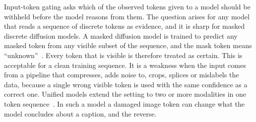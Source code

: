 
Input-token gating asks which of the observed tokens given to a model should be withheld before the model reasons from
them.
The question arises for any model that reads a sequence of discrete tokens as evidence, and it is sharp for masked
discrete diffusion models.
A masked diffusion model is trained to predict any masked token from any visible subset of the sequence, and the mask
token means ``unknown''~\citep{austin2021d3pm,sahoo2024mdlm,ou2025radd}.
Every token that is visible is therefore treated as certain.
This is acceptable for a clean training sequence.
It is a weakness when the input comes from a pipeline that compresses, adds noise to, crops, splices or mislabels the data,
because a single wrong visible token is used with the same confidence as a correct one.
Unified models extend the setting to two or more modalities in one token sequence~\citep{swerdlow2025unidisc,yang2025mmada,li2025lavida,shi2025muddit}.
In such a model a damaged image token can change what the model concludes about a caption, and the reverse.

